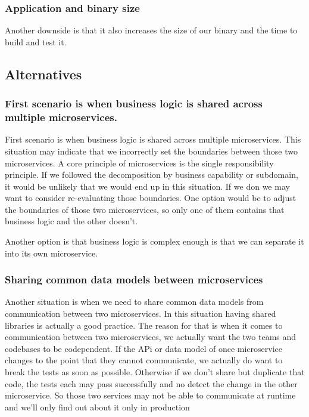 \subsubsection{Application and binary size}
Another downside is that it also increases the size of our binary and the time to build and test it.

\subsection{Alternatives}

\subsubsection{First scenario is when business logic is shared across multiple microservices.}
First scenario is when business logic is shared across multiple microservices.
This situation may indicate that we incorrectly set the boundaries between those two microservices.
A core principle of microservices is the single responsibility principle.
If we followed the decomposition by business capability or subdomain, it would be unlikely that we would end up in this situation.
If we don we may want to consider re-evaluating those boundaries.
One option would be to adjust the boundaries of those two microservices, so only one of them contains that business logic and the other doesn't.

Another option is that business logic is complex enough is that we can separate it into its own microservice.

\subsubsection{Sharing common data models between microservices}
Another situation is when we need to share common data models from communication between two microservices.
In this situation having shared libraries is actually a good practice.
The reason for that is when it comes to communication between two microservices, we actually want the two teams and codebases to be codependent.
If the APi or data model of once microservice changes to the point that they cannot communicate, we actually do want to break the tests as soon as possible.
Otherwise if we don't share but duplicate that code, the tests each may pass successfully and no detect the change in the other microservice.
So those two services may not be able to communicate at runtime and we'll only find out about it only in production

